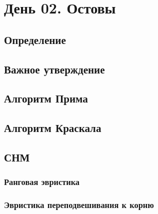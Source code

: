 \documentclass[a4paper,12pt]{article}
\begin{document}
  \section{День 02. Остовы}

    \subsection{Определение}

    \subsection{Важное утверждение}

    \subsection{Алгоритм Прима}

    \subsection{Алгоритм Краскала}

    \subsection{СНМ}
      \subsubsection{Ранговая эвристика}
      \subsubsection{Эвристика переподвешивания к корню}
\end{document}
